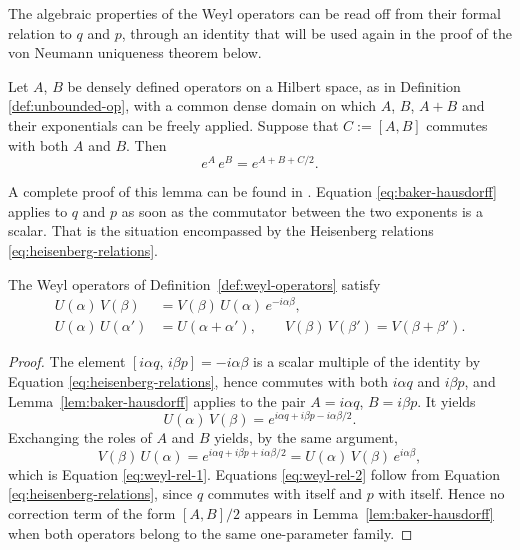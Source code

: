 	\noindent The algebraic properties of the Weyl operators can be read off from their formal relation to $q$ and $p$, through an identity that will be used again in the proof of the von Neumann uniqueness theorem below.
	
	\begin{lemma}
		\label{lem:baker-hausdorff}
		Let $A$, $B$ be densely defined operators on a Hilbert space, as in Definition \ref{def:unbounded-op}, with a common dense domain on which $A$, $B$, $A+B$ and their exponentials can be freely applied. Suppose that $C := [A,B]$ commutes with both $A$ and $B$. Then
		\begin{equation}
			e^A\,e^B = e^{A+B+C/2}.
			\label{eq:baker-hausdorff}
		\end{equation}
	\end{lemma}
	
	\noindent A complete proof of this lemma can be found in \cite[p.61]{strocchiIntroductionMathematicalStructure2005}. Equation \eqref{eq:baker-hausdorff} applies to $q$ and $p$ as soon as the commutator between the two exponents is a scalar. That is the situation encompassed by the Heisenberg relations \eqref{eq:heisenberg-relations}.
	
	\begin{proposition}
		\label{prop:weyl-relations}
		The Weyl operators of Definition~\ref{def:weyl-operators} satisfy
		\begin{align}
			U(\alpha)\,V(\beta) &= V(\beta)\,U(\alpha)\,e^{-i\alpha\beta}, \label{eq:weyl-rel-1}\\
			U(\alpha)\,U(\alpha') &= U(\alpha+\alpha'), \qquad V(\beta)\,V(\beta') = V(\beta+\beta'). \label{eq:weyl-rel-2}
		\end{align}
	\end{proposition}
	
	\begin{proof}
		The element $[i\alpha q,\, i\beta p] = -i\alpha\beta$ is a scalar multiple of the identity by Equation \eqref{eq:heisenberg-relations}, hence commutes with both $i\alpha q$ and $i\beta p$, and Lemma~\ref{lem:baker-hausdorff} applies to the pair $A=i\alpha q$, $B=i\beta p$. It yields
		\begin{equation}
			U(\alpha)\,V(\beta) = e^{i\alpha q + i\beta p - i\alpha\beta/2}.
		\end{equation}
		Exchanging the roles of $A$ and $B$ yields, by the same argument,
		\begin{equation}
			V(\beta)\,U(\alpha) = e^{i\alpha q + i\beta p + i\alpha\beta/2} = U(\alpha)\,V(\beta)\,e^{i\alpha\beta},
		\end{equation}
		which is Equation \eqref{eq:weyl-rel-1}. Equations \eqref{eq:weyl-rel-2} follow from Equation \eqref{eq:heisenberg-relations}, since $q$ commutes with itself and $p$ with itself. Hence no correction term of the form $[A,B]/2$ appears in Lemma~\ref{lem:baker-hausdorff} when both operators belong to the same one-parameter family.
	\end{proof}
	

